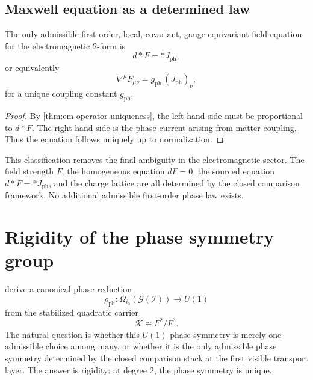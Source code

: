 \subsection{Maxwell equation as a determined law}
\begin{corollary}
	The only admissible first-order, local, covariant, gauge-equivariant
	field equation for the electromagnetic $2$-form is
	\[
		d{*}F = {*}J_{\mathrm{ph}},
	\]
	or equivalently
	\[
		\nabla^\mu F_{\mu\nu} = g_{\mathrm{ph}}\, (J_{\mathrm{ph}})_\nu,
	\]
	for a unique coupling constant $g_{\mathrm{ph}}$.
\end{corollary}
\begin{proof}
	By \cref{thm:em-operator-uniqueness}, the left-hand side must be
	proportional to $d{*}F$.
	The right-hand side is the phase current arising from matter coupling.
	Thus the equation follows uniquely up to normalization.
\end{proof}
\begin{remark}
	This classification removes the final ambiguity in the electromagnetic
	sector.
	The field strength $F$, the homogeneous equation $dF=0$, the sourced
	equation $d{*}F={*}J_{\mathrm{ph}}$, and the charge lattice are all
	determined by the
	closed comparison framework.
	No additional admissible first-order phase law exists.
\end{remark}
\section{Rigidity of the phase symmetry group}
\label{sec:phase-group-rigidity}
derive a canonical phase reduction
\[
	\rho_{\mathrm{ph}}:\Omega_{i_0}(\mathcal G(\mathcal I))\to U(1)
\]
from the stabilized quadratic carrier
\[
	\mathcal K \cong F^2/F^3.
\]
The natural question is whether this $U(1)$ phase symmetry is merely one
admissible choice among many, or whether it is the only admissible phase
symmetry determined by the closed comparison stack at the first visible
transport layer.
The answer is rigidity: at degree $2$, the phase symmetry is unique.
